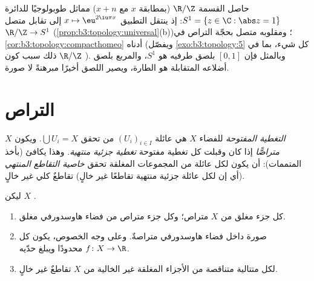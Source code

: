 \begin{example}\label{ex:b3:topology:circle}
حاصل القسمة $\R/\Z$ (بمطابقة $x$ مع $x + n$) مماثل طوبولوجيًا
للدائرة $S^1 = \{z \in \C : \abs z = 1\}$: إذ ينتقل التطبيق $x
\mapsto \eu^{2\iu\pi x}$ إلى تقابل متصل
$\R/\Z \to S^1$ (\cref{prop:b3:topology:universal}(b))؛ ومقلوبه متصل بحجّة التراص في
\cref{cor:b3:topology:compacthomeo} أدناه (ويفصّل \cref{exo:b3:topology:5} كل شيء، بما في ذلك سبب كون
$\R/\Z$  ). وبالمثل فإن $[0,1]$ بلصق طرفيه
هو $S^1$، والمربع بلصق أضلاعه المتقابلة هو الطارة، ويصير اللصق
أخيرًا مبرهنةً لا صورة.
\end{example}

\section{التراص}

\begin{definition}\label{def:b3:topology:compact}
\emph{التغطية المفتوحة} للفضاء $X$ هي عائلة $(U_i)_{i\in I}$ من
 تحقق $\bigcup U_i = X$. ويكون $X$
\emph{متراصًّا} إذا كان  وقبلت كل
تغطية مفتوحة \emph{تغطية جزئية منتهية}. وهذا يكافئ (بأخذ
المتممات): أن يكون لكل عائلة من المجموعات المغلقة تحقق
\emph{خاصية التقاطع المنتهي} (أي إن لكل عائلة جزئية منتهية
تقاطعًا غير خالٍ) تقاطعٌ كلي غير خالٍ.
\end{definition}

\begin{theorem}\label{thm:b3:topology:compactprops}
ليكن $X$ .
\begin{enumerate}
  \item كل جزء مغلق من $X$ متراص؛ وكل جزء متراص من فضاء
        هاوسدورفي مغلق.
  \item صورة   داخل فضاء هاوسدورفي متراصةٌ.
        وعلى وجه الخصوص، يكون كل  $f\colon X
        \to \R$ محدودًا
        ويبلغ حدّيه.
  \item لكل متتالية متناقصة من الأجزاء المغلقة غير الخالية من
        $X$ تقاطعٌ غير خالٍ.
\end{enumerate}
\end{theorem}

